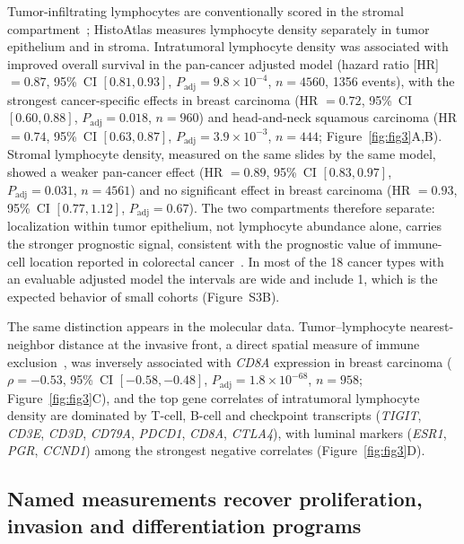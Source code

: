 Tumor-infiltrating lymphocytes are conventionally scored in the stromal
compartment~\cite{salgado2015til}; HistoAtlas measures lymphocyte density
separately in tumor epithelium and in stroma. Intratumoral
lymphocyte density was associated with improved overall survival in the
pan-cancer adjusted model (hazard ratio [HR] $= 0.87$, 95\%~CI $[0.81, 0.93]$,
$P_{\mathrm{adj}} = 9.8 \times 10^{-4}$, $n = \num{4560}$, \num{1356} events),
with the strongest cancer-specific effects in breast carcinoma (HR $= 0.72$,
95\%~CI $[0.60, 0.88]$, $P_{\mathrm{adj}} = 0.018$, $n = 960$) and head-and-neck
squamous carcinoma (HR $= 0.74$, 95\%~CI $[0.63, 0.87]$,
$P_{\mathrm{adj}} = 3.9 \times 10^{-3}$, $n = 444$; Figure~\ref{fig:fig3}A,B).
Stromal lymphocyte density, measured on the same slides by the same model,
showed a weaker pan-cancer effect (HR $= 0.89$, 95\%~CI $[0.83, 0.97]$,
$P_{\mathrm{adj}} = 0.031$, $n = \num{4561}$) and no significant effect in breast
carcinoma (HR $= 0.93$, 95\%~CI $[0.77, 1.12]$, $P_{\mathrm{adj}} = 0.67$). The
two compartments therefore separate: localization within tumor epithelium, not
lymphocyte abundance alone, carries the stronger prognostic
signal, consistent with the prognostic value of immune-cell location reported in
colorectal cancer~\cite{galon2006, pages2018}. In most of the 18 cancer types with an
evaluable adjusted model the intervals are wide and include 1, which is the expected
behavior of small cohorts (Figure~S3B).

The same distinction appears in the molecular data. Tumor--lymphocyte
nearest-neighbor distance at the invasive front, a direct spatial measure of
immune exclusion~\cite{joyce2015exclusion}, was inversely associated with
\textit{CD8A} expression in breast carcinoma ($\rho = -0.53$, 95\%~CI
$[-0.58, -0.48]$, $P_{\mathrm{adj}} = 1.8 \times 10^{-68}$, $n = 958$;
Figure~\ref{fig:fig3}C), and the top gene correlates of intratumoral lymphocyte
density are dominated by T-cell, B-cell and checkpoint transcripts
(\textit{TIGIT}, \textit{CD3E}, \textit{CD3D}, \textit{CD79A}, \textit{PDCD1},
\textit{CD8A}, \textit{CTLA4}), with luminal markers (\textit{ESR1},
\textit{PGR}, \textit{CCND1}) among the strongest negative correlates
(Figure~\ref{fig:fig3}D).

\subsection{Named measurements recover proliferation, invasion and differentiation programs}
\label{sec:results:bridge}

